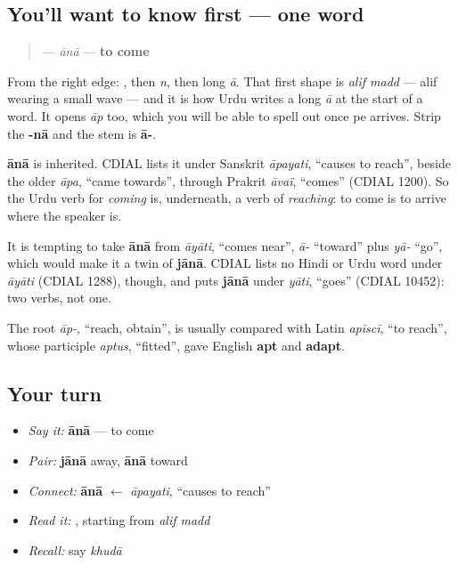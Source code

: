 \subsection*{You'll want to know first — one word}
\begin{quote}
\textbf{} — \emph{ānā} — \textbf{to come}
\end{quote}

From the right edge: \textbf{}, then \textbf{} \emph{n}, then \textbf{} long \emph{ā}. That first shape is \emph{alif madd} — alif wearing a small wave — and it is how Urdu writes a long \emph{ā} at the start of a word. It opens \emph{āp} too, which you will be able to spell out once pe arrives. Strip the \textbf{-nā} and the stem is \textbf{ā-}.

\begin{cousinweb}
\textbf{ānā} is inherited. CDIAL lists it under Sanskrit \emph{āpayati}, “causes to reach”, beside the older \emph{āpa}, “came towards”, through Prakrit \emph{āvaï}, “comes” (CDIAL 1200). So the Urdu verb for \emph{coming} is, underneath, a verb of \emph{reaching}: to come is to arrive where the speaker is.

It is tempting to take \textbf{ānā} from \emph{āyāti}, “comes near”, \emph{ā-} “toward” plus \emph{yā-} “go”, which would make it a twin of \textbf{jānā}. CDIAL lists no Hindi or Urdu word under \emph{āyāti} (CDIAL 1288), though, and puts \textbf{jānā} under \emph{yāti}, “goes” (CDIAL 10452): two verbs, not one.

The root \emph{āp-}, “reach, obtain”, is usually compared with Latin \emph{apīscī}, “to reach”, whose participle \emph{aptus}, “fitted”, gave English \textbf{apt} and \textbf{adapt}.
\end{cousinweb}

\subsection*{Your turn}
\begin{itemize}
\raggedright
  \item \emph{Say it:} \textbf{ānā} — to come
  \item \emph{Pair:} \textbf{jānā} away, \textbf{ānā} toward
  \item \emph{Connect:} \textbf{ānā} $\leftarrow$ \emph{āpayati}, “causes to reach”
  \item \emph{Read it:} \textbf{}, starting from \emph{alif madd}
  \item \emph{Recall:} say \emph{khudā}
\end{itemize}

